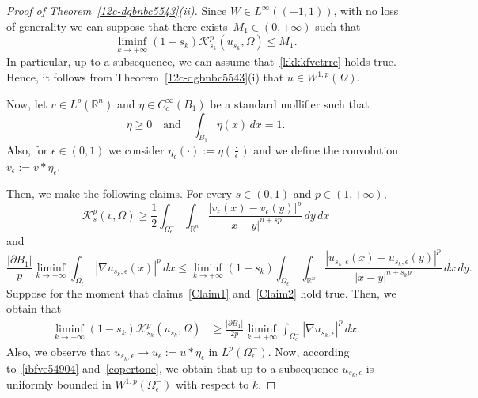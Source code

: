 \documentclass[12pt]{article}
\newcommand{\R}{\mathbb{R}}
\numberwithin{equation}{section}
\renewcommand{\leq}{\leqslant}
\renewcommand{\geq}{\geqslant}
\begin{document}
\begin{proof}[Proof of Theorem~\ref{12c-dgbnbc5543}(ii)]
Since $W\in L^\infty((-1,1))$, with no loss of generality we can suppose that there exists~$M_1\in(0,+\infty)$ such that
\begin{equation}\label{ibfve54904}
\liminf_{k\to +\infty}(1-s_k)\mathcal{K}_{s_k}^p(u_{s_k},\Omega)\leq M_1.
\end{equation} 
In particular, up to a subsequence, we can assume that~\eqref{kkkkfvetrre} holds true. Hence, it follows from Theorem~\ref{12c-dgbnbc5543}(i) that $u\in W^{1,p}(\Omega)$.  

Now, let $v \in L^p(\R^n)$ and $\eta\in C_c^\infty(B_1)$ be a standard mollifier such that
\begin{equation*}
\eta\geq 0\quad\mbox{and}\quad \int_{B_1}\eta(x)\,dx=1.
\end{equation*}
Also, for $\epsilon\in (0,1)$ we consider $\eta_\epsilon(\cdot):=\eta \left(\frac{\cdot}{\epsilon}\right)$ and  we define the convolution $v_\epsilon:=v\ast \eta_\epsilon$. 

Then, we make the following claims. For every $s\in(0,1)$ and $p\in(1,+\infty)$, 
\begin{equation}\label{Claim1}
\mathcal{K}_{s}^p(v,\Omega)\geq \frac{1}{2}\int_{\Omega_{\epsilon}^{-}}\int_{\R^n}\frac{\left|v_\epsilon(x)-v_\epsilon(y)\right|^p}{\left|x-y\right|^{n+s p}}\,dy\,dx
\end{equation}
and
\begin{equation}\label{Claim2}
\frac{\left|\partial B_1\right|}{p}\liminf_{k\to +\infty} \int_{\Omega_{\epsilon}^{-}} \left|\nabla u_{s_k,\epsilon}(x)\right|^p \,dx\leq \liminf_{k\to +\infty}(1-s_k) \int_{\Omega_\epsilon^{-}}\int_{\R^n} \frac{\left|u_{s_k,\epsilon}(x)-u_{s_k,\epsilon}(y)\right|^p}{\left|x-y\right|^{n+s_kp}}\,dx\,dy. 
\end{equation}
Suppose for the moment that claims~\eqref{Claim1} and~\eqref{Claim2} hold true. Then, we obtain that 
\begin{equation}\label{copertone}
\begin{split}
\liminf_{k\to +\infty} (1-s_k)\mathcal{K}_{s_k}^p(u_{s_k},\Omega) &\geq \frac{\left|\partial B_1\right|}{2p} \liminf_{k\to +\infty}\int_{\Omega_\epsilon^{-}} \left|\nabla u_{s_k,\epsilon}\right|^p\,dx. 
\end{split}
\end{equation}
Also, we observe that $u_{s_k,\epsilon}\to u_\epsilon:=u\ast \eta_\epsilon$ in $L^p(\Omega_{\epsilon}^-)$. Now, according to~\eqref{ibfve54904} and~\eqref{copertone}, we obtain that up to a subsequence $u_{s_k,\epsilon}$ is  uniformly bounded in $W^{1,p}(\Omega_{\epsilon}^{-})$ with respect to $k$. 


\end{proof}
\end{document}
